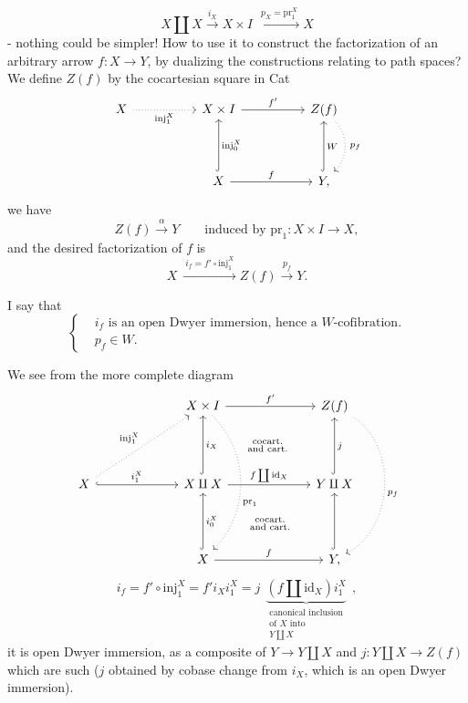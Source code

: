 \[
X \amalg X \xrightarrow{i_X} X \times I \ \xrightarrow{\ p_X = \mathrm{pr}_1^X\ } X
\]
- nothing could be simpler! How to use it to construct the factorization of an arbitrary arrow $f : X \longrightarrow Y$, by dualizing the constructions relating to path spaces? We define $Z(f)$ by the cocartesian square in Cat
\[
\begin{tikzcd}[column sep=5em, row sep=4em]
X \arrow[r, dotted, "\mathrm{inj}_1^X"'] & X \times I \arrow[r, "f'"] & Z(f) \arrow[d, dotted, bend left=45, "\,p_f"] \\
& X \arrow[u, hook, "\mathrm{inj}_0^X"'] \arrow[r, "f"] & Y, \arrow[u, hook, "W"']
\end{tikzcd}
\]
we have
\[
Z(f) \xrightarrow{\alpha} Y \qquad \text{induced by } \mathrm{pr}_1 : X \times I \longrightarrow X,
\]
and the desired factorization of $f$ is
\[
X \ \xrightarrow{\ i_f = f' \circ \mathrm{inj}_1^X\ } Z(f) \xrightarrow{p_f} Y.
\]

I say that
\[
\left\{
\begin{aligned}
& i_f \text{ is an open Dwyer immersion, hence a } W\text{-cofibration.} \\
& p_f \in W.
\end{aligned}
\right.
\]

We see from the more complete diagram
\[
\begin{tikzcd}[column sep=6.5em, row sep=4.5em]
& X \times I \arrow[r, "f'"] \arrow[dd, dotted, bend left=45, "\mathrm{pr}_1"{pos=.60}] \arrow[dr, phantom, "\substack{\text{cocart.}\\ \text{and cart.}}"] & Z(f) \arrow[dd, dotted, bend left=60, "p_f"] \\
X \arrow[ur, dotted, "\mathrm{inj}_1^X"] \arrow[r, hook, "i_1^X"] & X \amalg X \arrow[u, hook, "i_X"'] \arrow[r, "f \coprod \mathrm{id}_X"] \arrow[dr, phantom, "\substack{\text{cocart.}\\ \text{and cart.}}"] & Y \amalg X \arrow[u, hook, "j"'] \\
& X \arrow[u, hook, "i_0^X"'] \arrow[r, "f"] & Y, \arrow[u, hook]
\end{tikzcd}
\]
\[
i_f = f' \circ \mathrm{inj}_1^X = f' i_X i_1^X = j \ \ \underbrace{(f \amalg \mathrm{id}_X) i_1^X}_{\substack{\text{canonical inclusion}\\ \text{of } X \text{ into}\\ Y \coprod X}} \ \ ,
\]
it is open Dwyer immersion, as a composite of $Y \longrightarrow Y \amalg X$ and $j : Y \amalg X \longrightarrow Z(f)$ which are such ($j$ obtained by cobase change from $i_X$, which is an open Dwyer immersion).

